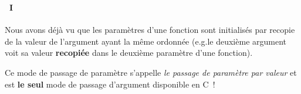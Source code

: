 \begin{frame}%
  \frametitle{\secname}
  \framesubtitle{\subsecname~I}

  Nous avons déjà vu que les paramètres d'une fonction sont initialisés par recopie de la valeur de l'argument ayant la même ordonnée
  (e.g.le deuxième argument voit sa valeur \textbf{recopiée} dans le deuxième paramètre d'une fonction).
  \vspace{0.5cm}
  \par
  Ce mode de passage de paramètre s'appelle \textit{le passage de paramètre par valeur} et est \textbf{le seul} mode de passage 
  d'argument disponible en C~!
\end{frame}

